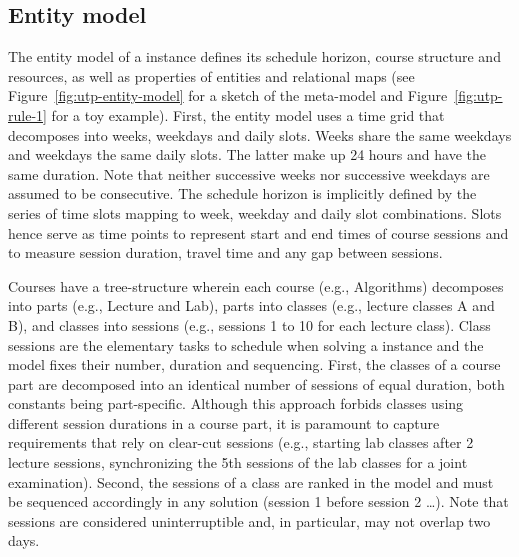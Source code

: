 \subsection{Entity model}
\label{sec:entity-model}
The entity model of a {\UTP} instance defines its schedule horizon, course structure and resources, as well as properties of entities and relational maps (see 
Figure~\ref{fig:utp-entity-model} for a sketch of the meta-model and Figure~\ref{fig:utp-rule-1} for a toy example).  
First, the entity model uses a time grid that decomposes into weeks, weekdays and daily slots. %
Weeks share the same weekdays and weekdays the same daily slots. The latter make up 24 hours and have the same duration. %
Note that neither successive weeks nor successive weekdays are assumed to be consecutive. %
The schedule horizon is implicitly defined by the series of time slots mapping to week, weekday and daily slot combinations. Slots hence serve as time points to represent start and end times of course sessions and to measure session duration, travel time and any gap between sessions.


Courses have a tree-structure wherein each course (e.g., Algorithms) decomposes into parts (e.g., Lecture and Lab), parts into classes (e.g., lecture classes A and B), and classes into sessions (e.g., sessions 1 to 10 for each lecture class). Class sessions are the elementary tasks to schedule when solving a {\UTP} instance and the model fixes their number, duration and sequencing. First, the classes of a course part are decomposed into an identical number of sessions of equal duration, both constants being part-specific. Although this approach forbids classes using different session durations in a course part, 
it is paramount to capture requirements that rely on clear-cut sessions (e.g., starting lab classes after 2 lecture sessions, synchronizing the 5th sessions of the lab classes for a joint examination). Second, the sessions of a class are ranked in the model and must be sequenced accordingly in any solution (session 1 before session 2 \ldots). Note that sessions are considered uninterruptible and, in particular, may not overlap two days. 

